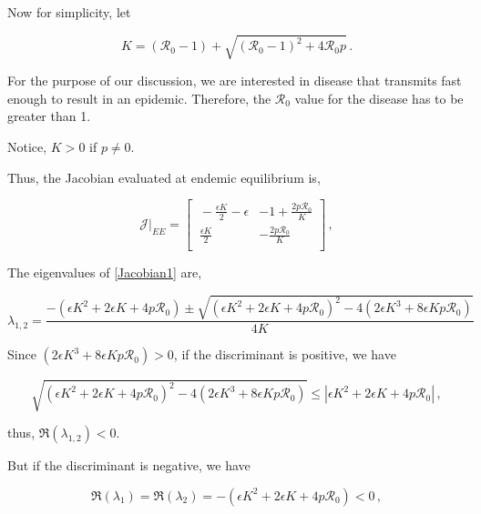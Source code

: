 \documentclass[12pt]{article}
\newcommand{\R}{\mathcal{R}}
\begin{document}
Now for simplicity, let 
\begin{linenomath*}
\begin{equation}\label{E:}
K = (\R_0-1)+ \sqrt{(\R_0-1)^2+4\R_0 p} \,.
\end{equation}
\end{linenomath*}

For the purpose of our discussion, we are interested in disease that transmits fast enough to result in an epidemic. Therefore, the $\R_0$ value for the disease has to be greater than 1.

Notice, $K>0$ if $p\neq 0$.

Thus, the Jacobian evaluated at endemic equilibrium is,
\begin{linenomath*}
\begin{equation}
\mathcal{J}|_{EE} =
\begin{bmatrix}
    \ -\frac{\epsilon K}{2}-\epsilon       & -1+\frac{2p \R_0}{K} \\
    \ \frac{\epsilon K}{2}       & -\frac{2p \R_0}{K} \\
\end{bmatrix} \label{Jacobian1} \,,
\end{equation}
\end{linenomath*}

The eigenvalues of \autoref{Jacobian1} are,
\begin{linenomath*}
\begin{equation}
\lambda_{1,2} = \frac{-(\epsilon K^2+2\epsilon K +4p\mathcal{R}_0) \pm \sqrt{(\epsilon K^2+2\epsilon K +4p\mathcal{R}_0)^2-4(2\epsilon K^3+8\epsilon Kp\mathcal{R}_0)}}{4K}
\end{equation}
\end{linenomath*}

Since $(2\epsilon K^3+8\epsilon Kp\mathcal{R}_0)>0$, if the discriminant is positive, we have
\begin{linenomath*}
\begin{equation}
\sqrt{(\epsilon K^2+2\epsilon K +4p\mathcal{R}_0)^2-4(2\epsilon
  K^3+8\epsilon Kp\mathcal{R}_0)}
 \leq|\epsilon K^2+2\epsilon K +4p\mathcal{R}_0|  \,,
\end{equation}
\end{linenomath*}

thus, $\Re(\lambda_{1,2})<0$.

But if the discriminant is negative, we have
\begin{linenomath*}
\begin{equation}
\Re(\lambda_1)=\Re(\lambda_2)=-(\epsilon K^2+2\epsilon K +4p\mathcal{R}_0)<0  \,,
\end{equation}
\end{linenomath*}
\end{document}
